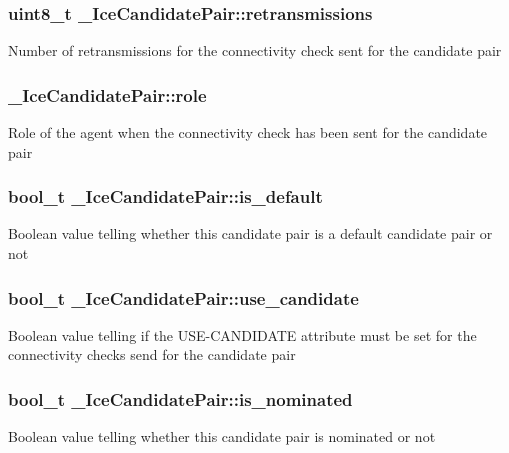 \subsubsection[{retransmissions}]{\setlength{\rightskip}{0pt plus 5cm}uint8\-\_\-t \-\_\-\-Ice\-Candidate\-Pair\-::retransmissions}\label{struct__IceCandidatePair_aaac3713a3ae22f72ba8e282f60094a84}
Number of retransmissions for the connectivity check sent for the candidate pair 
\subsubsection[{role}]{ \-\_\-\-Ice\-Candidate\-Pair\-::role}\label{struct__IceCandidatePair_a7a9c3e96efc6ea595f1b8f80896f4b20}
Role of the agent when the connectivity check has been sent for the candidate pair 
\subsubsection[{is\-\_\-default}]{\setlength{\rightskip}{0pt plus 5cm}bool\-\_\-t \-\_\-\-Ice\-Candidate\-Pair\-::is\-\_\-default}\label{struct__IceCandidatePair_a8d0e670fbbd8faff39f147d37e03f7db}
Boolean value telling whether this candidate pair is a default candidate pair or not 
\subsubsection[{use\-\_\-candidate}]{\setlength{\rightskip}{0pt plus 5cm}bool\-\_\-t \-\_\-\-Ice\-Candidate\-Pair\-::use\-\_\-candidate}\label{struct__IceCandidatePair_ade0f25dd51aeddca137f9733fded3f8e}
Boolean value telling if the U\-S\-E-\/\-C\-A\-N\-D\-I\-D\-A\-T\-E attribute must be set for the connectivity checks send for the candidate pair 
\subsubsection[{is\-\_\-nominated}]{\setlength{\rightskip}{0pt plus 5cm}bool\-\_\-t \-\_\-\-Ice\-Candidate\-Pair\-::is\-\_\-nominated}\label{struct__IceCandidatePair_aaa24f39a17b3715384256822dc40a1f6}
Boolean value telling whether this candidate pair is nominated or not 
